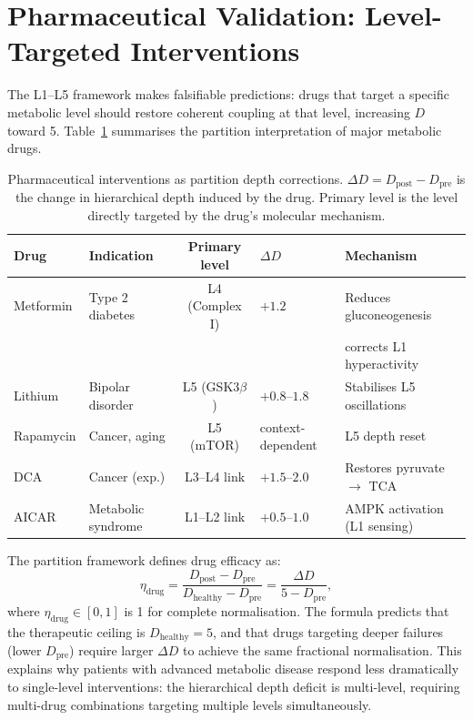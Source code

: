 \section{Pharmaceutical Validation: Level-Targeted Interventions}
\label{sec:pharmaceuticals}

The L1--L5 framework makes falsifiable predictions: drugs that target a
specific metabolic level should restore coherent coupling at that level,
increasing $D$ toward 5. Table~\ref{tab:drug_targets} summarises the
partition interpretation of major metabolic drugs.

\begin{table}[htbp]
\centering
\caption{Pharmaceutical interventions as partition depth corrections.
  $\Delta D = D_{\mathrm{post}} - D_{\mathrm{pre}}$ is the change in
  hierarchical depth induced by the drug. Primary level is the level
  directly targeted by the drug's molecular mechanism.}
\label{tab:drug_targets}
\begin{tabular}{llcll}
\toprule
Drug & Indication & Primary level & $\Delta D$ & Mechanism \\
\midrule
Metformin & Type 2 diabetes & L4 (Complex I) & $+1.2$ & Reduces gluconeogenesis \\
          &                  &                &        & corrects L1 hyperactivity \\
Lithium   & Bipolar disorder & L5 (GSK3$\beta$) & $+0.8$--$1.8$ & Stabilises L5 oscillations \\
Rapamycin & Cancer, aging   & L5 (mTOR)      & context-dependent & L5 depth reset \\
DCA       & Cancer (exp.)   & L3--L4 link    & $+1.5$--$2.0$ & Restores pyruvate $\to$ TCA \\
AICAR     & Metabolic syndrome & L1--L2 link & $+0.5$--$1.0$ & AMPK activation (L1 sensing) \\
\bottomrule
\end{tabular}
\end{table}

\begin{remark}
The partition framework defines drug efficacy as:
\begin{equation}
  \eta_{\mathrm{drug}} = \frac{D_{\mathrm{post}} - D_{\mathrm{pre}}}{D_{\mathrm{healthy}} - D_{\mathrm{pre}}}
  = \frac{\Delta D}{5 - D_{\mathrm{pre}}},
  \label{eq:drug_efficacy}
\end{equation}
where $\eta_{\mathrm{drug}} \in [0,1]$ is 1 for complete normalisation.
The formula predicts that the therapeutic ceiling is $D_{\mathrm{healthy}} = 5$,
and that drugs targeting deeper failures (lower $D_{\mathrm{pre}}$) require
larger $\Delta D$ to achieve the same fractional normalisation. This explains
why patients with advanced metabolic disease respond less dramatically to
single-level interventions: the hierarchical depth deficit is multi-level,
requiring multi-drug combinations targeting multiple levels simultaneously.
\end{remark}

